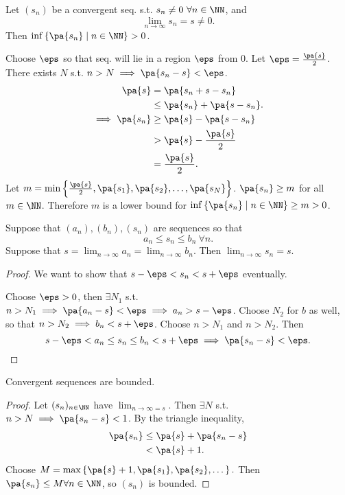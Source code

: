 \documentclass[11pt]{scrartcl}
\numberwithin{equation}{section}
\begin{document}
\begin{example}
    Let $(s_n)$ be a convergent seq. s.t. $s_n\neq 0 \ \forall n \in \NN$,
    and 
    \[ \lim_{n\rightarrow \infty}s_n = s \neq 0.\] 
    Then $\inf \left\{\pa{s_n}\mid n \in \NN\right\}>0$.

    Choose $\eps$ so that seq. will lie in a region $\eps$ from 
    $0$. Let $\eps = \frac{\pa{s}}{2}$. 
    There exists $N$ s.t. 
    $n>N \implies \pa{s_n-s}<\eps$.
    \begin{align*}
        \pa{s} &= \pa{s_n+s-s_n} \\
        &\leq \pa{s_n} + \pa{s-s_n}.\\
        \implies \pa{s_n} &\geq \pa{s}-\pa{s-s_n} \\
        &> \pa{s}-\frac{\pa{s}}{2}\\ 
        &= \frac{\pa{s}}{2}.
    \end{align*}
    Let $m =\min \left\{\frac{\pa{s}}{2}, \pa{s_1},\pa{s_2},\dots, \pa{s_N}\right\}$. $\pa{s_n} \geq m$ for all $m\in \NN$.
    Therefore $m$ is a lower bound for $\inf\left\{\pa{s_n}\mid n \in \NN\right\}\geq m > 0$.
\end{example}
\begin{theorem}
    \label{thm:sandle}
    Suppose that $(a_n),(b_n),(s_n)$ are sequences so that 
    \[ a_n\leq s_n \leq b_n \ \forall n. \]
    Suppose that $s=\lim_{n\rightarrow \infty} a_n = \lim_{n\rightarrow \infty} b_n.$ Then $\lim_{n\rightarrow \infty} s_n =s$. 
\end{theorem}
\begin{proof}
    We want to show that $s-\eps<s_n<s+\eps$ eventually.
    
    Choose $\eps>0$, then $\exists N_1$ s.t. 
    $n>N_1 \implies \pa{a_n-s}<\eps \implies a_n>s-\eps$.
    Choose $N_2$ for $b$ as well, so that
    $n>N_2\implies b_n<s+\eps$. Choose $n>N_1$ and $n > N_2$. Then 
    \[ s-\eps < a_n \leq s_n \leq b_n < s+ \eps 
    \implies \pa{s_n-s} < \eps. \qedhere \]
\end{proof}
\begin{proposition}
    Convergent sequences are bounded.
\end{proposition}
\begin{proof}
    Let $(s_n)_{n\in\NN}$ have $\lim_{n\rightarrow\infty =s}$.
    Then $\exists N$ s.t. $n>N\implies \pa{s_n-s}<1$.
    By the triangle inequality,
    \begin{align*}
        \pa{s_n} &\leq \pa{s}+\pa{s_n-s} \\
        &<\pa{s}+1.
    \end{align*}
    Choose $M = \max \left\{\pa{s}+1, \pa{s_1},\pa{s_2},\dots\right\}.$
    Then $\pa{s_n}\leq M\forall n \in \NN$, so $(s_n)$ is bounded.
\end{proof}
\end{document}

